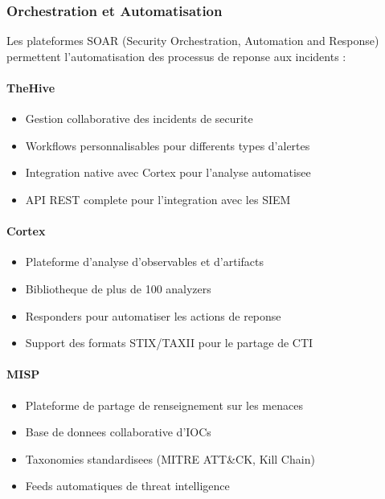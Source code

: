 \subsubsection{Orchestration et Automatisation}

Les plateformes SOAR (Security Orchestration, Automation and Response) permettent l'automatisation des processus de reponse aux incidents :

\paragraph{TheHive}
\begin{itemize}
    \item Gestion collaborative des incidents de securite
    \item Workflows personnalisables pour differents types d'alertes
    \item Integration native avec Cortex pour l'analyse automatisee
    \item API REST complete pour l'integration avec les SIEM
\end{itemize}

\paragraph{Cortex}
\begin{itemize}
    \item Plateforme d'analyse d'observables et d'artifacts
    \item Bibliotheque de plus de 100 analyzers
    \item Responders pour automatiser les actions de reponse
    \item Support des formats STIX/TAXII pour le partage de CTI
\end{itemize}

\paragraph{MISP}
\begin{itemize}
    \item Plateforme de partage de renseignement sur les menaces
    \item Base de donnees collaborative d'IOCs
    \item Taxonomies standardisees (MITRE ATT\&CK, Kill Chain)
    \item Feeds automatiques de threat intelligence
\end{itemize}

